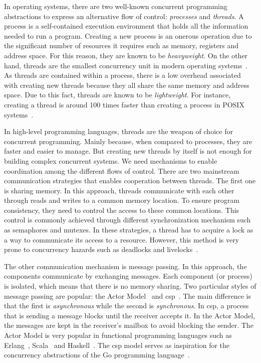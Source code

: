 In operating systems, there are two well-known concurrent programming abstractions to express an alternative flow of control: \emph{processes} and \emph{threads}. A process is a self-contained execution environment that holds all the information needed to run a program. Creating a new process is an onerous operation due to the significant number of resources it requires such as memory, registers and address space. For this reason, they are known to be \emph{heavyweight}. On the other hand, threads are the smallest concurrency unit in modern operating systems~\citep{tanenbaum:2007}. As threads are contained within a process, there is a low overhead associated with creating new threads because they all share the same memory and address space. Due to this fact, threads are known to be \emph{lightweight}. For instance, creating a thread is around 100 times faster than creating a process in POSIX systems~\citep{butenhof:1997}.

In high-level programming languages, threads are the weapon of choice for concurrent programming. Mainly because, when compared to processes, they are faster and easier to manage. But creating new threads by itself is not enough for building complex concurrent systems. We need mechanisms to enable coordination among the different flows of control. There are two mainstream communication strategies that enables cooperation between threads. The first one is sharing memory. In this approach, threads communicate with each other through reads and writes to a common memory location. To ensure program consistency, they need to control the access to these common locations. This control is commonly achieved through different synchronization mechanism such as semaphores and mutexes. In these strategies, a thread has to acquire a lock as a way to communicate its access to a resource. However, this method is very prone to concurrency hazards such as deadlocks and livelocks~\citep{herlihy:2012}.

The other communication mechanism is message passing. In this approach, the components communicate by exchanging messages. Each component (or process) is isolated, which means that there is no memory sharing. Two particular styles of message passing are popular: the Actor Model~\citep{agha:1986} and \ac{csp}~\citep{hoare:1978}. The main difference is that the first is \emph{asynchronous} while the second is \emph{synchronous}. In \acs{csp}, a process that is sending a message blocks until the receiver accepts it. In the Actor Model, the messages are kept in the receiver's mailbox to avoid blocking the sender. The Actor Model is very popular in functional programming languages such as Erlang~\citep{armstrong:2007}, Scala~\citep{haller:2009} and Haskell~\citep{epstein:2011}. The \acs{csp} model serves as inspiration for the concurrency abstractions of the Go programming language~\citep{pike:2012}.


